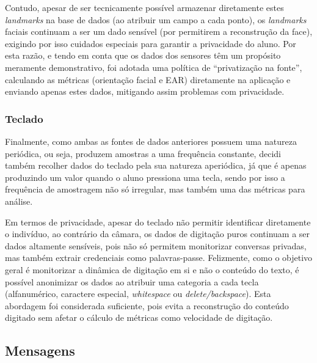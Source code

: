 Contudo, apesar de ser tecnicamente possível armazenar diretamente estes \textit{landmarks} na base de dados (ao atribuir um campo a cada ponto), os \textit{landmarks} faciais continuam a ser um dado sensível (por permitirem a reconstrução da face), exigindo por isso cuidados especiais para garantir a privacidade do aluno.
Por esta razão, e tendo em conta que os dados dos sensores têm um propósito meramente demonstrativo, foi adotada uma política de ``privatização na fonte'', calculando as métricas (orientação facial e \ac{EAR}) diretamente na aplicação e enviando apenas estes dados, mitigando assim problemas com privacidade.

\subsubsection{Teclado}

Finalmente, como ambas as fontes de dados anteriores possuem uma natureza periódica, ou seja, produzem amostras a uma frequência constante, decidi também recolher dados do teclado pela sua natureza aperiódica, já que é apenas produzindo um valor quando o aluno pressiona uma tecla, sendo por isso a frequência de amostragem não só irregular, mas também uma das métricas para análise.

Em termos de privacidade, apesar do teclado não permitir identificar diretamente o indivíduo, ao contrário da câmara, os dados de digitação puros continuam a ser dados altamente sensíveis, pois não só permitem monitorizar conversas privadas, mas também extrair credenciais como palavras-passe.
Felizmente, como o objetivo geral é monitorizar a dinâmica de digitação em si e não o conteúdo do texto, é possível anonimizar os dados ao atribuir uma categoria a cada tecla (alfanumérico, caractere especial, \textit{whitespace} ou \textit{delete/backspace}). 
Esta abordagem foi considerada suficiente, pois evita a reconstrução do conteúdo digitado sem afetar o cálculo de métricas como velocidade de digitação.

\subsection{Mensagens}


